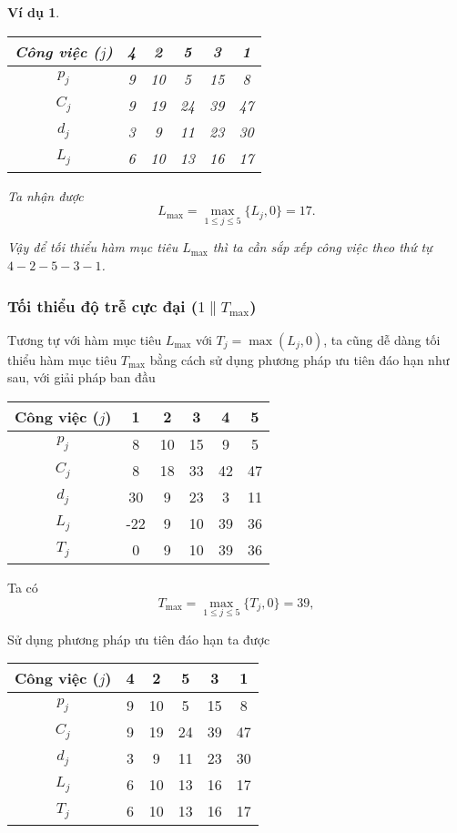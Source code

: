 \documentclass[12pt,a4paper]{report}
\newtheorem{vd}{Ví dụ}
\begin{document}
\begin{vd}
\begin{table}[h!]
	\centering
	\begin{tabular}{|c | c c c c c |} 
	\hline
	Công việc ($j$) & 4 & 2 & 5 & 3 & 1 \\
	\hline\hline
	$p_j$ & 9 & 10 & 5 & 15 & 8 \\
	$C_j$ & 9 & 19 & 24 & 39 & 47 \\
	$d_j$ & 3 & 9 & 11 & 23 & 30 \\
	$L_j$ & 6 & 10 & 13 & 16 & 17 \\
	\hline
	\end{tabular}
\end{table}

Ta nhận được
\begin{equation*}
	L_{\max} = \max _{1 \leq j \leq 5} \{L_j, 0\} = 17.
\end{equation*}

Vậy để tối thiểu hàm mục tiêu $L_{\max}$ thì ta cần sắp xếp công việc theo thứ tự $4-2-5-3-1$.
\end{vd}

\subsubsection*{Tối thiểu độ trễ cực đại ($1 \| T_{\max}$)}
Tương tự với hàm mục tiêu $L_{\max}$ với $T_j=\max (L_j,0)$, ta cũng dễ dàng tối thiểu hàm mục tiêu $T_{\max}$ bằng cách sử dụng phương pháp ưu tiên đáo hạn như sau, với giải pháp ban đầu

\begin{table}[h!]
	\centering
	\begin{tabular}{|c | c c c c c |} 
	\hline
	Công việc ($j$) & 1 & 2 & 3 & 4 & 5 \\
	\hline\hline
	$p_j$ & 8 & 10 & 15 & 9 & 5 \\
	$C_j$ & 8 & 18 & 33 & 42 & 47 \\
	$d_j$ & 30 & 9 & 23 & 3 & 11 \\
	$L_j$ & -22 & 9 & 10 & 39 & 36 \\
	$T_j$ & 0 & 9 & 10 & 39 & 36 \\
	\hline
	\end{tabular}
\end{table}
Ta có
\begin{equation*}
	T_{\max} = \max _{1 \leq j \leq 5} \{T_j, 0\} = 39,
\end{equation*}

Sử dụng phương pháp ưu tiên đáo hạn ta được

\begin{table}[h!]
	\centering
	\begin{tabular}{|c | c c c c c |} 
	\hline
	Công việc ($j$) & 4 & 2 & 5 & 3 & 1 \\
	\hline\hline
	$p_j$ & 9 & 10 & 5 & 15 & 8 \\
	$C_j$ & 9 & 19 & 24 & 39 & 47 \\
	$d_j$ & 3 & 9 & 11 & 23 & 30 \\
	$L_j$ & 6 & 10 & 13 & 16 & 17 \\
	$T_j$ & 6 & 10 & 13 & 16 & 17 \\
	\hline
	\end{tabular}
\end{table}
\end{document}

